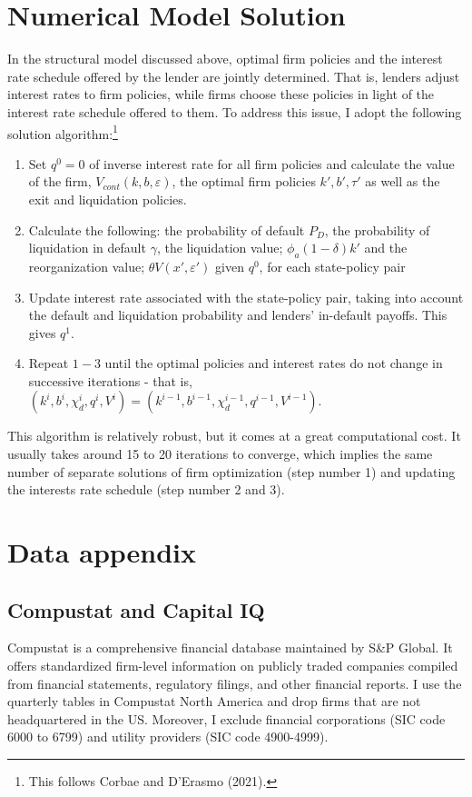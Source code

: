 \documentclass[12pt]{article}
\begin{document}
\section{Numerical Model Solution \label{sec: qualitative analysis}}

In the structural model discussed above, optimal firm policies and the interest rate schedule offered by the lender are jointly determined. That is, lenders adjust interest rates to firm policies, while firms choose these policies in light of the interest rate schedule offered to them. To address this issue, I adopt the following solution algorithm:\footnote{This follows Corbae and D'Erasmo (2021).}
\begin{enumerate}
    \item Set $q^0 = 0$ of inverse interest rate for all firm policies and calculate the value of the firm, $V_{cont}(k,b,\varepsilon)$, the optimal firm policies $k', b', \tau'$ as well as the exit and liquidation policies. 
    \item Calculate the following: the probability of default $P_D$, the probability of liquidation in default $\gamma$, the liquidation value; $\phi_a (1-\delta) k'$ and the reorganization value; $\theta V (x', \varepsilon')$ given $q^0$, for each state-policy pair
    \item Update interest rate associated with the state-policy pair, taking into account the default and liquidation probability and lenders' in-default payoffs. This gives $q^1$. 
    \item Repeat $1-3$ until the optimal policies and interest rates do not change in successive iterations - that is, $ (k^{i},b^{i},\chi_d^{i},q^{i}, V^{i}) = (k^{i-1},b^{i-1},\chi_d^{i-1}, q^{i-1}, V^{i-1}) $.
\end{enumerate}
This algorithm is relatively robust, but it comes at a great computational cost. It usually takes around 15 to 20 iterations to converge, which implies the same number of separate solutions of firm optimization (step number 1) and updating the interests rate schedule (step number 2 and 3). 

\section{Data appendix \label{sec:A3}}
\subsection{Compustat and Capital IQ}
Compustat is a comprehensive financial database maintained by S\&P Global. It offers standardized firm-level information on publicly traded companies compiled from financial statements, regulatory filings, and other financial reports. I use the quarterly tables in Compustat North America and drop firms that are not headquartered in the US. Moreover, I exclude financial corporations (SIC code 6000 to 6799) and utility providers (SIC code 4900-4999). 
\end{document}
